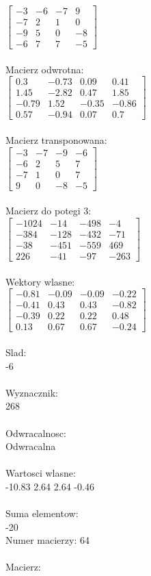 \documentclass[a4paper,12pt]{article}
\begin{document}
$\begin{bmatrix} -3&-6&-7&9\\-7&2&1&0\\-9&5&0&-8\\-6&7&7&-5 \end{bmatrix}$
\\
\\
Macierz odwrotna:\\

$\begin{bmatrix} 0.3&-0.73&0.09&0.41\\1.45&-2.82&0.47&1.85\\-0.79&1.52&-0.35&-0.86\\0.57&-0.94&0.07&0.7 \end{bmatrix}$
\\
\\
Macierz transponowana:\\

$\begin{bmatrix} -3&-7&-9&-6\\-6&2&5&7\\-7&1&0&7\\9&0&-8&-5 \end{bmatrix}$
\\
\\
Macierz do potegi 3:\\

$\begin{bmatrix} -1024&-14&-498&-4\\-384&-128&-432&-71\\-38&-451&-559&469\\226&-41&-97&-263 \end{bmatrix}$
\\
\\
Wektory wlasne:\\

$\begin{bmatrix} -0.81&-0.09&-0.09&-0.22\\-0.41&0.43&0.43&-0.82\\-0.39&0.22&0.22&0.48\\0.13&0.67&0.67&-0.24 \end{bmatrix}$
\\
\\
Slad:\\
-6
\\
\\
Wyznacznik:\\
268
\\
\\
Odwracalnosc:\\
Odwracalna
\\
\\
Wartosci wlasne:\\
-10.83 2.64 2.64 -0.46
\\
\\
Suma elementow:\\
-20
\\
\newpage
Numer macierzy:
64
\\
\\
Macierz:\\
\end{document}
